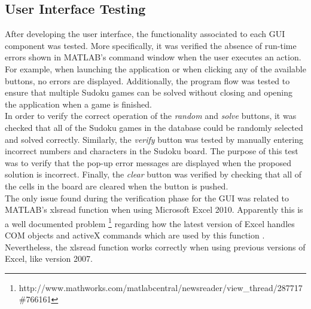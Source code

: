\documentclass[12pt,a4paper]{article} %
\begin{document}
\subsection{User Interface Testing}
After developing the user interface, the functionality associated to each GUI component was tested. More specifically, it was verified the absence of run-time errors shown in MATLAB’s command window when the user executes an action. For example, when launching the application or when clicking any of the available buttons, no errors are displayed. Additionally, the program flow was tested to ensure that multiple Sudoku games can be solved without closing and opening the application when a game is finished.
\newline
\\In order to verify the correct operation of the \textit{random} and \textit{solve} buttons, it was checked that all of the Sudoku games in the database could be randomly selected and solved correctly. Similarly, the \textit{verify} button was tested by manually entering incorrect numbers and characters in the Sudoku board. The purpose of this test was to verify that the pop-up error messages are displayed when the proposed solution is incorrect. Finally, the \textit{clear} button was verified by checking that all of the cells in the board are cleared when the button is pushed.
\newline
\\The only issue found during the verification phase for the GUI was related to MATLAB’s xlsread function when using Microsoft Excel 2010. Apparently this is a well documented problem \footnote{http://www.mathworks.com/matlabcentral/newsreader/view\_thread/287717\#766161} regarding how the latest version of Excel handles COM objects and activeX commands which are used by this function . Nevertheless, the xlsread function works correctly when using previous versions of Excel, like version 2007. 
\end{document}
